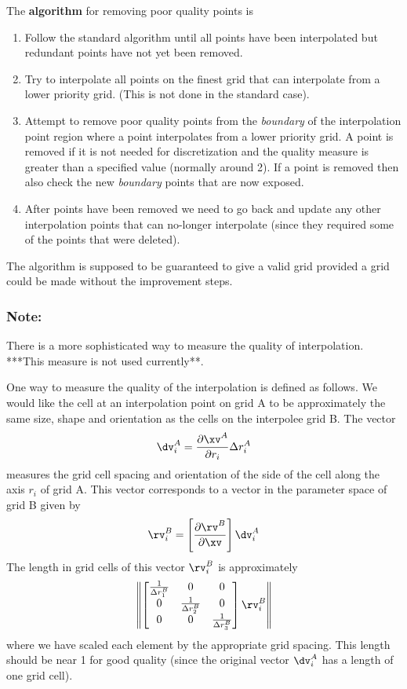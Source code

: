 The {\bf algorithm} for removing poor quality points is
\begin{enumerate}
   \item Follow the standard algorithm until all points have been interpolated but redundant points
      have not yet been removed. 
   \item Try to interpolate all points on the finest grid that can interpolate from a lower priority
    grid. (This is not done in the standard case).
   \item Attempt to remove poor quality points from the {\em boundary} of the interpolation point
     region where a point interpolates from a lower priority grid. A point is removed if it is
     not needed for discretization and the quality measure is greater than a specified value (normally
     around 2).  If a point is removed then also check the new {\em boundary}
     points that are now exposed.
   \item After points have been removed we need to go back and update any other interpolation points
     that can no-longer interpolate (since they required some of the points that were deleted).
\end{enumerate}
The algorithm is supposed to be guaranteed to give a valid grid provided a grid could be made
without the improvement steps.

\subsubsection{Note:}

There is a more sophisticated way to measure the quality of interpolation. ***This measure
is not used currently**.

One way to measure the quality of the interpolation is defined as follows. 
We would like the cell at an interpolation point on grid A to be approximately the
same size, shape and orientation as the cells on the interpolee grid B. The vector
\[
     \dv^A_i = {\partial \xv^A \over \partial r_i} \Delta r^A_i 
\] 
measures the grid cell spacing and orientation of the side of the cell along the axis $r_i$ 
of grid A. This vector corresponds to a vector in the parameter space of grid B given by
\[
   \rv^B_i = \left[ {\partial \rv^B \over \partial \xv} \right] \dv_i^A
\]
The length in grid cells of this vector $\rv^B_i$ is approximately
\[
  \left\| \begin{bmatrix} {1\over\Delta r_1^B} & 0 & 0 \\
                          0 & {1\over\Delta r_2^B} & 0  \\
                          0 & 0 & {1\over\Delta r_3^B}  \end{bmatrix} 
      \rv^B_i \right\|
\]
where we have scaled each element by the appropriate grid spacing.
This length should be near 1 for good quality (since the original vector $\dv^A_i$ has a
length of one grid cell).


